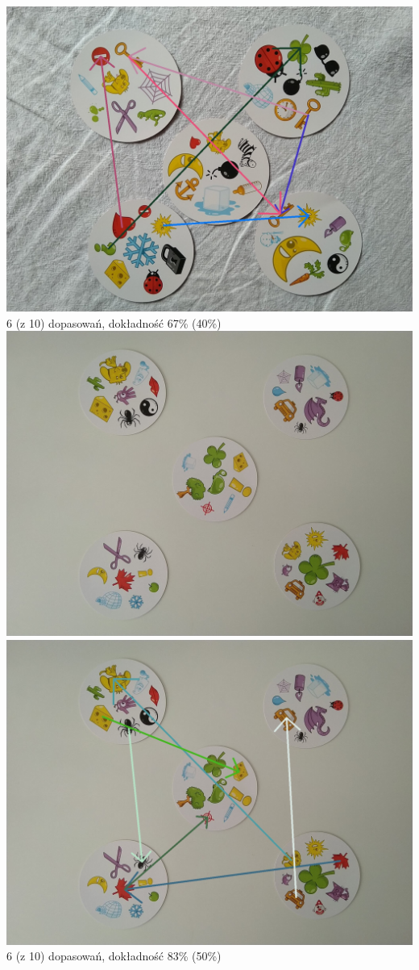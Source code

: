 \documentclass[10pt,a4paper]{article}
\begin{document}
\begin{center}
\includegraphics[scale=0.28]{hard/img_arrows25.jpg}\\
6 (z 10) dopasowań, dokładność 67\% (40\%)
\includegraphics[scale=0.28]{hard/dobble27.jpg}
\includegraphics[scale=0.28]{hard/img_arrows27.jpg}\\
6 (z 10) dopasowań, dokładność 83\% (50\%)
\end{center}
\newpage
\end{document}
